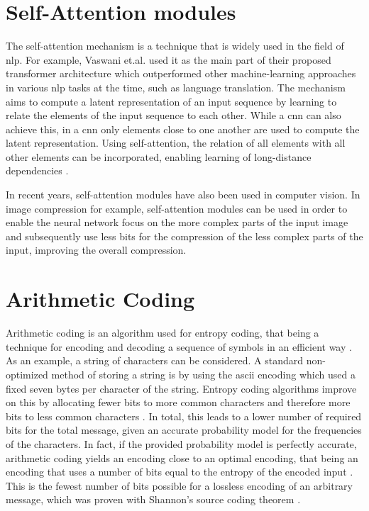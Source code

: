 \section{Self-Attention modules}
The self-attention mechanism is a technique that is widely used in the field of \ac{nlp}. For example, Vaswani et.al. \citep{vaswani_attention_2017} used it as the main part of their proposed transformer architecture which outperformed other machine-learning approaches in various \ac{nlp} tasks at the time, such as language translation. The mechanism aims to compute a latent representation of an input sequence by learning to relate the elements of the input sequence to each other. While a \ac{cnn} can also achieve this, in a \ac{cnn} only elements close to one another are used to compute the latent representation. Using self-attention, the relation of all elements with all other elements can be incorporated, enabling learning of long-distance dependencies \citep{vaswani_attention_2017}.

In recent years, self-attention modules have also been used in computer vision. In image compression for example, self-attention modules can be used in order to enable the neural network focus on the more complex parts of the input image and subsequently use less bits for the compression of the less complex parts of the input, improving the overall compression\citep{cheng_learned_2020, liu_non-local_2019}. 

\section{Arithmetic Coding}
\label{sec:arithmetic}
Arithmetic coding is an algorithm used for entropy coding, that being a technique for encoding and decoding a sequence of symbols in an efficient way \citep{witten_arithmetic_1987}. As an example, a string of characters can be considered. A standard non-optimized method of storing a string is by using the \ac{ascii} encoding which used a fixed seven bytes per character of the string. Entropy coding algorithms improve on this by allocating fewer bits to more common characters and therefore more bits to less common characters \citep{witten_arithmetic_1987}. In total, this leads to a lower number of required bits for the total message, given an accurate probability model for the frequencies of the characters. In fact, if the provided probability model is perfectly accurate, arithmetic coding yields an encoding close to an optimal encoding, that being an encoding that uses a number of bits equal to the entropy of the encoded input \citep{witten_arithmetic_1987}. This is the fewest number of bits possible for a lossless encoding of an arbitrary message, which was proven with Shannon's source coding theorem \citep{shannon_mathematical_1948,mackay_information_2003}.

